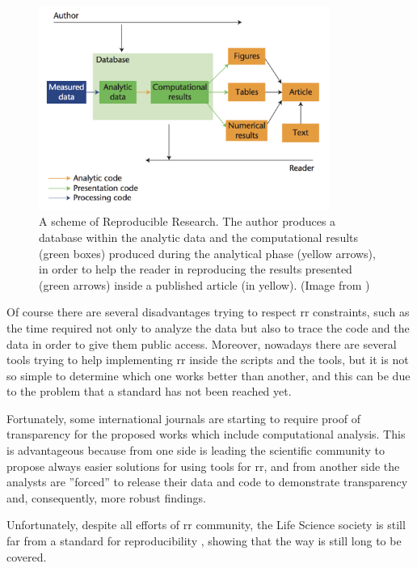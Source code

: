 \begin{figure}[H]
\centering
\includegraphics[width=9.5cm, keepaspectratio]{img/intro/rr_scheme.png}
\caption[RR generic scheme]{A scheme of Reproducible Research. 
The author produces a database within the analytic data and the computational results (green boxes) produced during the analytical phase (yellow arrows), in order to help the reader in reproducing the results presented (green arrows) inside a published article (in yellow). (Image from \cite{Peng2009})}
\label{fig:introrr}
\end{figure}

Of course there are several disadvantages trying to respect \gls{rr} constraints, such as the time required not only to analyze the data but also to trace the code and the data in order to give them public access. 
Moreover, nowadays there are several tools  \cite{Aranguren2015, Goecks2010a, Gentleman2004, Shepherd2018}  trying to help implementing \gls{rr} inside the scripts and the tools, but it is not so simple to determine which one works better than another, and this can be due to the problem that a standard has not been reached yet.

Fortunately, some international journals are starting to require proof of transparency for the proposed works which include computational analysis.
This is advantageous because from one side is leading the scientific community to propose always easier solutions for using tools for \gls{rr}, and from another side the analysts are ''forced'' to release their data and code to demonstrate transparency and, consequently, more robust findings.

Unfortunately, despite all efforts of \gls{rr} community, the Life Science society is still far from a standard for reproducibility \cite{Iqbal2016}, showing that the way is still long to be covered.


